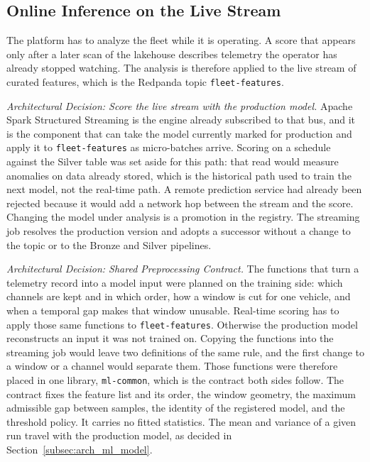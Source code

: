\subsection{Online Inference on the Live Stream}
\label{subsec:arch_ml_inference}

The platform has to analyze the fleet while it is operating. A score that appears only after a later scan of the lakehouse describes telemetry the operator has already stopped watching. The analysis is therefore applied to the live stream of curated features, which is the Redpanda topic \texttt{fleet-features}.

\textit{Architectural Decision: Score the live stream with the production model.}
Apache Spark Structured Streaming is the engine already subscribed to that bus, and it is the component that can take the model currently marked for production and apply it to \texttt{fleet-features} as micro-batches arrive. Scoring on a schedule against the Silver table was set aside for this path: that read would measure anomalies on data already stored, which is the historical path used to train the next model, not the real-time path. A remote prediction service had already been rejected because it would add a network hop between the stream and the score. Changing the model under analysis is a promotion in the registry. The streaming job resolves the production version and adopts a successor without a change to the topic or to the Bronze and Silver pipelines.

\textit{Architectural Decision: Shared Preprocessing Contract.}
The functions that turn a telemetry record into a model input were planned on the training side: which channels are kept and in which order, how a window is cut for one vehicle, and when a temporal gap makes that window unusable. Real-time scoring has to apply those same functions to \texttt{fleet-features}. Otherwise the production model reconstructs an input it was not trained on. Copying the functions into the streaming job would leave two definitions of the same rule, and the first change to a window or a channel would separate them. Those functions were therefore placed in one library, \texttt{ml-common}, which is the contract both sides follow. The contract fixes the feature list and its order, the window geometry, the maximum admissible gap between samples, the identity of the registered model, and the threshold policy. It carries no fitted statistics. The mean and variance of a given run travel with the production model, as decided in Section~\ref{subsec:arch_ml_model}.

